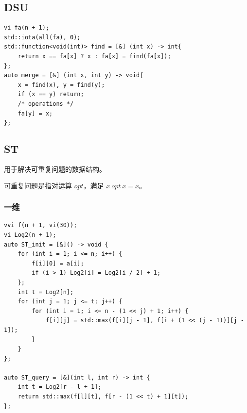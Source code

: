 \documentclass[UTF8, a4paper, titlepage, twoside]{ctexart}
\begin{document}
\subsection{ DSU }
\begin{lstlisting}[style=cpp]
vi fa(n + 1);
std::iota(all(fa), 0);
std::function<void(int)> find = [&] (int x) -> int{
    return x == fa[x] ? x : fa[x] = find(fa[x]);
};
auto merge = [&] (int x, int y) -> void{
    x = find(x), y = find(y);
    if (x == y) return;
    /* operations */
    fa[y] = x;
};
\end{lstlisting}

\subsection{ ST }

用于解决可重复问题的数据结构。

可重复问题是指对运算 $opt$，满足 $x \ opt \ x = x$。

\subsubsection*{ 一维 }
\begin{lstlisting}[style=cpp]
vvi f(n + 1, vi(30));
vi Log2(n + 1);
auto ST_init = [&]() -> void {
    for (int i = 1; i <= n; i++) {
        f[i][0] = a[i];
        if (i > 1) Log2[i] = Log2[i / 2] + 1;
    };
    int t = Log2[n];
    for (int j = 1; j <= t; j++) {
        for (int i = 1; i <= n - (1 << j) + 1; i++) {
            f[i][j] = std::max(f[i][j - 1], f[i + (1 << (j - 1))][j - 1]);
        }
    }
};

auto ST_query = [&](int l, int r) -> int {
    int t = Log2[r - l + 1];
    return std::max(f[l][t], f[r - (1 << t) + 1][t]);
};
\end{lstlisting}
\end{document}
